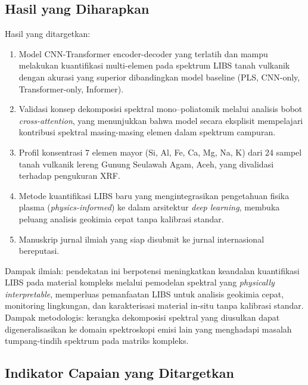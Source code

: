 \documentclass[12pt, a4paper]{article}
\begin{document}
\subsection{Hasil yang Diharapkan}

Hasil yang ditargetkan:
\begin{enumerate}[label=\arabic*., leftmargin=2cm]
    \item Model CNN-Transformer encoder-decoder yang terlatih dan mampu melakukan kuantifikasi multi-elemen pada spektrum LIBS tanah vulkanik dengan akurasi yang superior dibandingkan model baseline (PLS, CNN-only, Transformer-only, Informer).
    \item Validasi konsep dekomposisi spektral mono--poliatomik melalui analisis bobot \textit{cross-attention}, yang menunjukkan bahwa model secara eksplisit mempelajari kontribusi spektral masing-masing elemen dalam spektrum campuran.
    \item Profil konsentrasi 7 elemen mayor (Si, Al, Fe, Ca, Mg, Na, K) dari 24 sampel tanah vulkanik lereng Gunung Seulawah Agam, Aceh, yang divalidasi terhadap pengukuran XRF.
    \item Metode kuantifikasi LIBS baru yang mengintegrasikan pengetahuan fisika plasma (\textit{physics-informed}) ke dalam arsitektur \textit{deep learning}, membuka peluang analisis geokimia cepat tanpa kalibrasi standar.
    \item Manuskrip jurnal ilmiah yang siap disubmit ke jurnal internasional bereputasi.
\end{enumerate}


Dampak ilmiah: pendekatan ini berpotensi meningkatkan keandalan kuantifikasi LIBS pada material kompleks melalui pemodelan spektral yang \textit{physically interpretable}, memperluas pemanfaatan LIBS untuk analisis geokimia cepat, monitoring lingkungan, dan karakterisasi material in-situ tanpa kalibrasi standar. Dampak metodologis: kerangka dekomposisi spektral yang diusulkan dapat digeneralisasikan ke domain spektroskopi emisi lain yang menghadapi masalah tumpang-tindih spektrum pada matriks kompleks.

\subsection{Indikator Capaian yang Ditargetkan}
\end{document}
